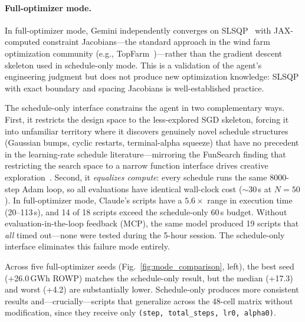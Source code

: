 \paragraph{Full-optimizer mode.}
In full-optimizer mode, Gemini independently converges on
SLSQP~\cite{kraft1988software} with JAX-computed constraint
Jacobians---the standard approach in the wind farm optimization
community (e.g.,
TopFarm~\cite{pedersen2019topfarm})---rather than the gradient
descent skeleton used in schedule-only mode. This is a validation
of the agent's engineering judgment but does not produce new
optimization knowledge: SLSQP with exact boundary and spacing
Jacobians is well-established practice.

The schedule-only interface constrains the agent in two
complementary ways. First, it restricts the design space to the
less-explored SGD skeleton, forcing it into unfamiliar territory
where it discovers genuinely novel schedule structures (Gaussian
bumps, cyclic restarts, terminal-alpha squeeze) that have no
precedent in the learning-rate schedule literature---mirroring the
FunSearch finding that restricting the search space to a narrow
function interface drives creative
exploration~\cite{fawzi2024funsearch}. Second, it \emph{equalizes
compute}: every schedule runs the same 8000-step Adam loop, so all
evaluations have identical wall-clock cost ($\sim$30\,s at
$N\!=\!50$). In full-optimizer mode, Claude's scripts have a
$5.6\!\times$ range in execution time (20--113\,s), and 14 of 18
scripts exceed the schedule-only 60\,s budget. Without
evaluation-in-the-loop feedback (MCP), the same model produced 19
scripts that \emph{all} timed out---none were tested during the
5-hour session. The schedule-only interface eliminates this failure
mode entirely.

Across five full-optimizer seeds
(Fig.~\ref{fig:mode_comparison}, left), the best seed
(+26.0\,GWh ROWP) matches the schedule-only result, but the median
(+17.3) and worst (+4.2) are substantially lower. Schedule-only
produces more consistent results and---crucially---scripts that
generalize across the 48-cell matrix without modification, since
they receive only \texttt{(step, total\_steps, lr0, alpha0)}.
